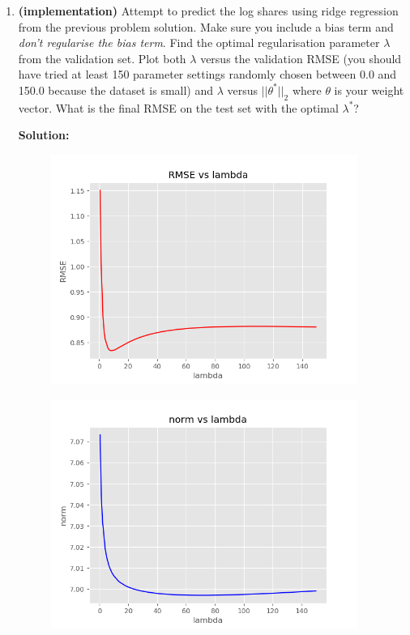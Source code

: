 \documentclass[letter,11pt]{article}
\newenvironment{solution}{
    \vspace{0.16in} {\bf Solution:}
    
}{
	\vspace{0.16in}
}
\begin{document}
\begin{enumerate}
\begin{enumerate}
        \item \textbf{(implementation)} Attempt to predict the log shares using ridge regression from the previous problem solution. Make sure you include a bias term and \textit{don't regularise the bias term}. Find the optimal regularisation parameter $\lambda$ from the validation set. Plot both $\lambda$ versus the validation RMSE (you should have tried at least 150 parameter settings randomly chosen between 0.0 and 150.0 because the dataset is small) and $\lambda$ versus $||\theta^*||_2$ where $\theta$ is your weight vector. What is the final RMSE on the test set with the optimal $\lambda^*$?

        \begin{solution}
            \begin{figure}[h]
                \centering
                \includegraphics[width=10cm]{RMSE_vs_lambda.png}
            \end{figure}

            \begin{figure}[H]
                \centering
                \includegraphics[width=10cm]{norm_vs_lambda.png}
            \end{figure}


\end{solution}
\end{enumerate}
\end{enumerate}
\end{document}
